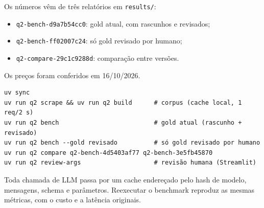\documentclass[11pt,a4paper]{article}
\begin{document}
Os números vêm de três relatórios em \texttt{results/}:
\begin{itemize}
  \item \texttt{q2-bench-d9a7b54cc0}: gold atual, com rascunhos e revisados;
  \item \texttt{q2-bench-ff02007c24}: só gold revisado por humano;
  \item \texttt{q2-compare-29c1c9288d}: comparação entre versões.
\end{itemize}
Os preços foram conferidos em 16/10/2026.
\begin{verbatim}
uv sync
uv run q2 scrape && uv run q2 build      # corpus (cache local, 1 req/2 s)
uv run q2 bench                          # gold atual (rascunho + revisado)
uv run q2 bench --gold revisado          # só gold revisado por humano
uv run q2 compare q2-bench-4d5403af77 q2-bench-3e5fb45870
uv run q2 review-args                    # revisão humana (Streamlit)
\end{verbatim}
Toda chamada de LLM passa por um cache endereçado pelo hash de modelo, mensagens, schema e
parâmetros. Reexecutar o benchmark reproduz as mesmas métricas, com o custo e a latência
originais.
\end{document}
